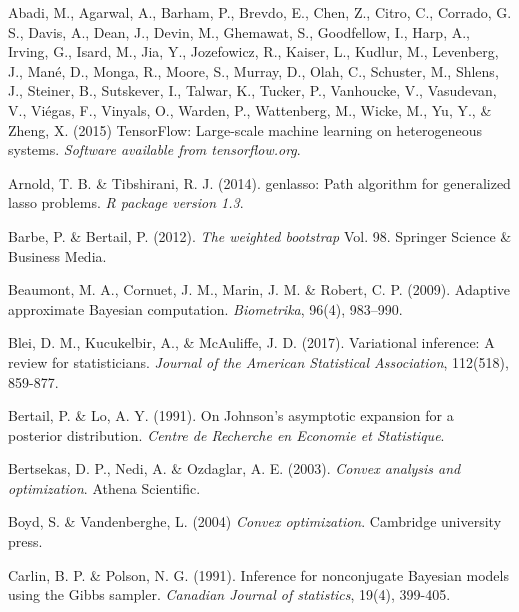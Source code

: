 \documentclass[12pt]{TD-CJS}
\begin{document}
\begin{thebibliography}{}

Abadi, M., Agarwal, A., Barham, P., Brevdo, E., Chen, Z., Citro, C., Corrado, G. S., Davis, A., Dean, J., Devin, M., Ghemawat, S., Goodfellow, I., Harp, A., Irving, G., Isard, M., Jia, Y., Jozefowicz, R., Kaiser, L., Kudlur, M., Levenberg, J., Man\'{e}, D., Monga, R., Moore, S., Murray, D., Olah, C., Schuster, M., Shlens, J., Steiner, B., Sutskever, I., Talwar, K., Tucker, P., Vanhoucke, V., Vasudevan, V., Vi\'{e}gas, F., Vinyals, O., Warden, P., Wattenberg, M., Wicke, M., Yu, Y., \& Zheng, X. (2015) TensorFlow: Large-scale machine learning on heterogeneous systems. {\it Software available from tensorflow.org}.

Arnold, T. B. \& Tibshirani, R. J. (2014). genlasso: Path algorithm for generalized lasso problems. {\it R package version 1.3}.

Barbe, P. \& Bertail, P. (2012). {\em The weighted bootstrap} Vol. 98. Springer Science \& Business Media.

Beaumont, M. A.,  Cornuet, J. M.,  Marin, J. M. \& Robert, C. P. (2009). Adaptive approximate Bayesian computation. {\it Biometrika}, 96(4), 983--990.

Blei, D. M., Kucukelbir, A., \& McAuliffe, J. D. (2017). Variational inference: A review for statisticians. {\it Journal of the American Statistical Association}, 112(518), 859-877.

Bertail, P. \& Lo,  A. Y.  (1991). On Johnson's asymptotic expansion for a posterior distribution. {\it Centre de Recherche en Economie et Statistique}.

Bertsekas, D. P., Nedi, A. \& Ozdaglar, A. E. (2003). {\em Convex analysis and optimization}. Athena Scientific.

Boyd, S. \& Vandenberghe, L. (2004) {\it Convex optimization}. Cambridge university press.

Carlin, B. P. \& Polson, N. G. (1991). Inference for nonconjugate Bayesian models using the Gibbs sampler. {\it Canadian Journal of statistics}, 19(4), 399-405.


\end{thebibliography}
\end{document}

